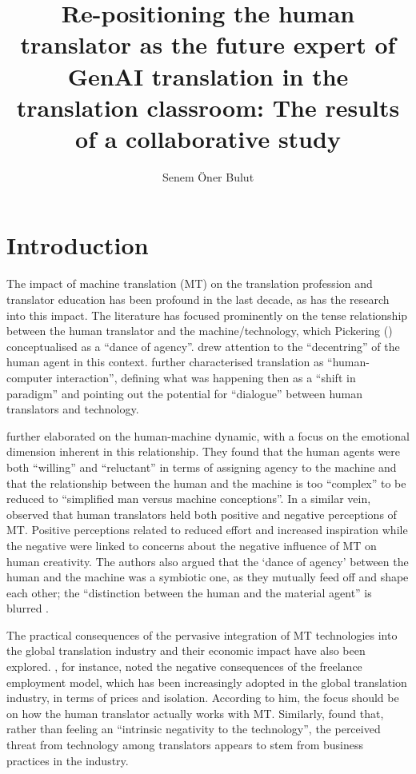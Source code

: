 \documentclass[output=paper,colorlinks,citecolor=brown]{langscibook}
\author{Senem Öner Bulut\orcid{0000-0002-6186-4924}\affiliation{Yıldız Technical University, Turkey} }
\title[Re-positioning the human translator]{Re-positioning the human translator as the future expert of GenAI translation in the translation classroom: The results of a collaborative study}
\begin{document}
\maketitle


\section{Introduction}
The impact of machine translation (MT) on the translation profession and translator education has been profound in the last decade, as has the research into this impact. The literature has focused prominently on the tense relationship between the human translator and the machine/technology, which Pickering (\citeyear{Pickering2008}) conceptualised as a “dance of agency”. \citet[354]{olohan_translators_2011} drew attention to the “decentring” of the human agent in this context. \citet[119--120]{OBrien2012} further characterised translation as “human-computer interaction”, defining what was happening then as a “shift in paradigm” and pointing out the potential for “dialogue” between human translators and technology.

\citet[321]{Ruokonen2017} further elaborated on the human-machine dynamic, with a focus on the emotional dimension inherent in this relationship. They found that the human agents were both “willing” and “reluctant” in terms of assigning agency to the machine and that the relationship between the human and the machine is too “complex” to be reduced to “simplified man versus machine conceptions”. In a similar vein, \citet[312]{cadwell_resistance_2018} observed that human translators held both positive and negative perceptions of MT. Positive perceptions related to reduced effort and increased inspiration while the negative were linked to concerns about the negative influence of MT on human creativity. The authors also argued that the `dance of agency' between the human and the machine was a symbiotic one, as they mutually feed off and shape each other; the “distinction between the human and the material agent” is blurred \citep[303]{cadwell_resistance_2018}.

The practical consequences of the pervasive integration of MT {technologies} into the global translation industry and their economic impact have also been explored. \citet{Moorkens2017_pressure}, for instance, noted the negative consequences of the freelance employment model, which has been increasingly adopted in the global translation industry, in terms of prices and isolation. According to him, the focus should be on how the human translator actually works with MT. Similarly, \citet[15]{Vieira2018} found that, rather than feeling an “intrinsic negativity to the technology”, the perceived threat from technology among translators appears to stem from business practices in the industry.
\end{document}

